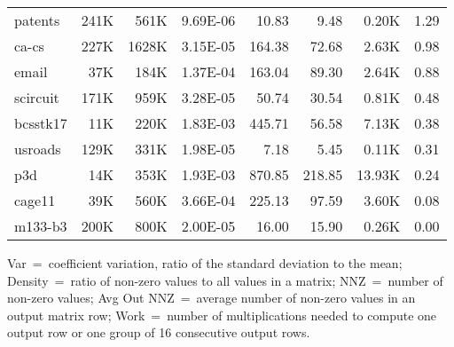\begin{table}[tp]
\begin{tabular}{lrrrrrrr}
    patents   & 241K &  561K & 9.69E-06 &  10.83  &   9.48     &  0.20K          & 1.29           \\
    ca-cs     & 227K & 1628K & 3.15E-05 & 164.38  &  72.68     &  2.63K          & 0.98           \\
    email     &  37K &  184K & 1.37E-04 & 163.04  &  89.30     &  2.64K          & 0.88           \\
    scircuit  & 171K &  959K & 3.28E-05 &  50.74  &  30.54     &  0.81K          & 0.48           \\
    bcsstk17  &  11K &  220K & 1.83E-03 & 445.71  &  56.58     &  7.13K          & 0.38           \\
    usroads   & 129K &  331K & 1.98E-05 &   7.18  &   5.45     &  0.11K          & 0.31           \\
    p3d       &  14K &  353K & 1.93E-03 & 870.85  & 218.85     & 13.93K          & 0.24           \\
    cage11    &  39K &  560K & 3.66E-04 & 225.13  &  97.59     &  3.60K          & 0.08           \\
    m133-b3   & 200K &  800K & 2.00E-05 &  16.00  &  15.90     &  0.26K          & 0.00           \\
    \bottomrule
  \end{tabular}

  \vspace{0.1cm}
  \raggedright
  Var~=~coefficient variation, ratio of the standard deviation to the mean;
  Density~=~ratio of non-zero values to all values in a matrix;
  NNZ~=~number of non-zero values;
  Avg Out NNZ~=~average number of non-zero values in an output matrix row;
  Work~=~number of multiplications needed to compute one output row or one
  group of 16 consecutive output rows.
  
  \label{tab-spz-datasets}
  \vspace{-0.1cm}
\end{table}

